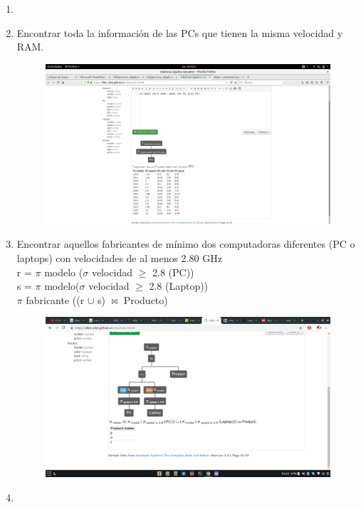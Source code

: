 \documentclass[a4paper, 12pt]{report}
\begin{document}
{\begin{enumerate}[label=\alph*)]
{}
\item{}
\item{Encontrar toda la información de las PCs que tienen la misma velocidad y
    RAM.\\
    \begin{figure}[H]
        \includegraphics[width=\textwidth]
            {img/h.png}\hfill
    \end{figure}
}
\item{Encontrar aquellos fabricantes de mínimo dos computadoras
	diferentes (PC o laptops) con
	velocidades de al menos 2.80 GHz\\
	r = $\pi$ modelo ($\sigma$ velocidad $\geq$ 2.8 (PC))\\
    s = $\pi$ modelo($\sigma$ velocidad $\geq$ 2.8 (Laptop))\\
    $\pi$ fabricante ((r $\cup$ s) $\Join$ Producto)\\
    \begin{figure}[H]
        \includegraphics[width=\textwidth]
            {img/i.png}\hfill
    \end{figure}
}
\item{}

\end{enumerate}}
\end{document}
